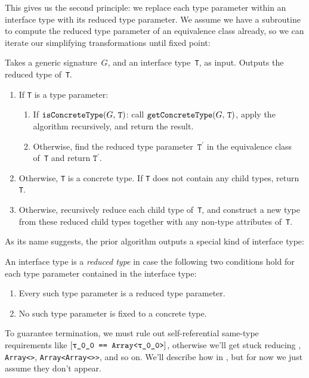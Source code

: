 \documentclass[../generics]{subfiles}
\begin{document}
This gives us the second principle: we replace each type parameter within an interface type with its reduced type parameter. We assume we have a subroutine to compute the reduced type parameter of an equivalence class already, so we can iterate our simplifying transformations until fixed point:

\begin{algorithm}\label{reduced type algorithm}
Takes a generic signature~$G$, and an interface type~\texttt{T}, as input. Outputs the reduced type of~\texttt{T}.
\begin{enumerate}
\item If \texttt{T} is a type parameter:
\begin{enumerate}
\item If $\texttt{isConcreteType}(G,\,\texttt{T})$: call $\texttt{getConcreteType}(G,\,\texttt{T})$, apply the algorithm recursively, and return the result.
\item Otherwise, find the reduced type parameter~$\texttt{T}^\prime$ in the equivalence class of~\texttt{T} and return $\texttt{T}^\prime$.
\end{enumerate}
\item Otherwise, \texttt{T} is a concrete type. If \texttt{T} does not contain any child types, return \texttt{T}.
\item Otherwise, recursively reduce each child type of~\texttt{T}, and construct a new type from these reduced child types together with any non-type attributes of~\texttt{T}.
\end{enumerate}
\end{algorithm}

As its name suggests, the prior algorithm outputs a special kind of interface type:

\begin{definition}
An interface type is a \emph{reduced type} in case the following two conditions hold for each type parameter contained in the interface type:
\begin{enumerate}
\item Every such type parameter is a reduced type parameter.
\item No such type parameter is fixed to a concrete type.
\end{enumerate}
\end{definition}

To guarantee termination, we must rule out self-referential same-type requirements like $\SameReq{\rT}{Array<\rT>}$, otherwise we'll get stuck reducing \rT, \texttt{Array<\rT>}, \texttt{Array<Array<\rT>>}, and so on. We'll describe how in , but for now we just assume they don't appear. 
\end{document}
